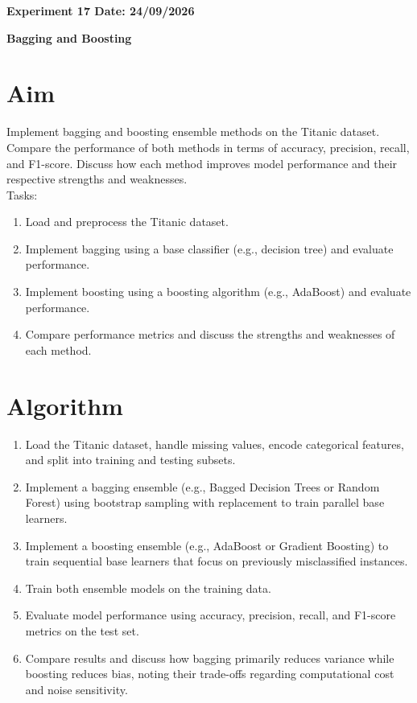 \documentclass[12pt, a4paper]{report}
\begin{document}
\newpage 
\begin{center}
	\bfseries 
	Experiment 17 \hfill Date:  24/09/2026
\end{center}


\begin{center}
	{\bfseries \Huge Bagging and Boosting}	
\end{center}

\section*{Aim} 
Implement bagging and boosting ensemble methods on the Titanic dataset. Compare the performance of both
methods in terms of accuracy, precision, recall, and F1-score. Discuss how each method improves model
performance and their respective strengths and weaknesses.\\
Tasks:
\begin{enumerate}[\quad -]
	\itemsep 0em 
	
	\item Load and preprocess the Titanic dataset.
	\item Implement bagging using a base classifier (e.g., decision tree) and evaluate performance.
	\item Implement boosting using a boosting algorithm (e.g., AdaBoost) and evaluate performance.
	\item Compare performance metrics and discuss the strengths and weaknesses of each method.
\end{enumerate}

\section*{Algorithm} 
\begin{enumerate}
	\item Load the Titanic dataset, handle missing values, encode categorical features, and split into training and testing subsets.
	\item Implement a bagging ensemble (e.g., Bagged Decision Trees or Random Forest) using bootstrap sampling with replacement to train parallel base learners.
	\item Implement a boosting ensemble (e.g., AdaBoost or Gradient Boosting) to train sequential base learners that focus on previously misclassified instances.
	\item Train both ensemble models on the training data.
	\item Evaluate model performance using accuracy, precision, recall, and F1-score metrics on the test set.
	\item Compare results and discuss how bagging primarily reduces variance while boosting reduces bias, noting their trade-offs regarding computational cost and noise sensitivity.
\end{enumerate}
\end{document}
